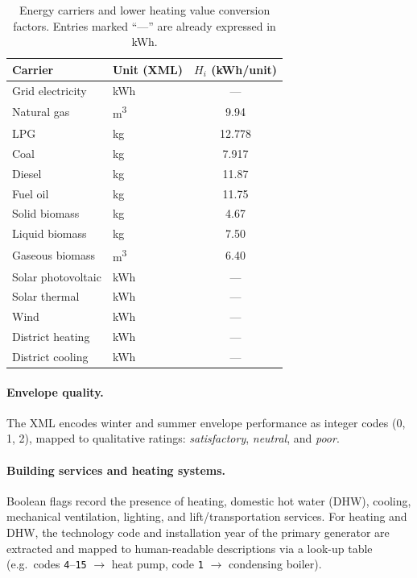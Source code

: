 \documentclass[runningheads,orivec]{llncs}
\begin{document}
\begin{table}[h]
\centering
\caption{Energy carriers and lower heating value conversion factors.
Entries marked ``---'' are already expressed in kWh.}
\label{tab:carriers}
\begin{tabular}{llc}
\toprule
\textbf{Carrier} & \textbf{Unit (XML)} & $H_i$ \textbf{(kWh/unit)} \\
\midrule
Grid electricity      & kWh   & --- \\
Natural gas           & m\textsuperscript{3} & 9.94 \\
LPG                   & kg    & 12.778 \\
Coal                  & kg    & 7.917 \\
Diesel                & kg    & 11.87 \\
Fuel oil              & kg    & 11.75 \\
Solid biomass         & kg    & 4.67  \\
Liquid biomass        & kg    & 7.50  \\
Gaseous biomass       & m\textsuperscript{3} & 6.40  \\
Solar photovoltaic    & kWh   & --- \\
Solar thermal         & kWh   & --- \\
Wind                  & kWh   & --- \\
District heating      & kWh   & --- \\
District cooling      & kWh   & --- \\
\bottomrule
\end{tabular}
\end{table}

\paragraph{Envelope quality.}
The XML encodes winter and summer envelope performance as integer
codes (0, 1, 2), mapped to qualitative ratings: \textit{satisfactory},
\textit{neutral}, and \textit{poor}.

\paragraph{Building services and heating systems.}
Boolean flags record the presence of heating, domestic hot water
(DHW), cooling, mechanical ventilation, lighting, and
lift/transportation services. For heating and DHW, the technology
code and installation year of the primary generator are extracted
and mapped to human-readable descriptions via a look-up table
(e.g.\ codes \texttt{4}--\texttt{15} $\to$ heat pump, code
\texttt{1} $\to$ condensing boiler).
\end{document}
